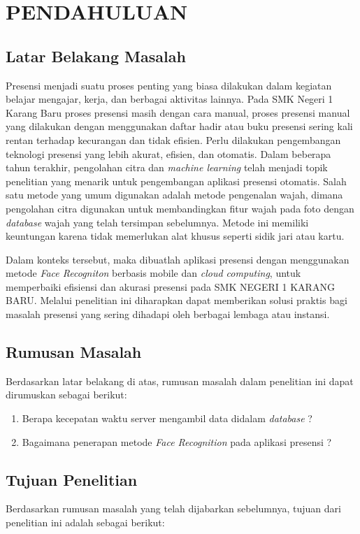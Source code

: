 \chapter{PENDAHULUAN}
\section{Latar Belakang Masalah}
Presensi menjadi suatu proses penting yang biasa dilakukan dalam kegiatan belajar mengajar, kerja, dan berbagai aktivitas lainnya. Pada SMK Negeri 1 Karang Baru proses presensi masih dengan cara manual, proses presensi manual yang dilakukan dengan menggunakan daftar hadir atau buku presensi sering kali rentan terhadap kecurangan dan tidak efisien. Perlu dilakukan pengembangan teknologi presensi yang lebih akurat, efisien, dan otomatis. Dalam beberapa tahun terakhir, pengolahan citra dan \emph{machine learning} telah menjadi topik penelitian yang menarik untuk pengembangan aplikasi presensi otomatis. Salah satu metode yang umum digunakan adalah metode pengenalan wajah, dimana pengolahan citra digunakan untuk membandingkan fitur wajah pada foto dengan \emph{database} wajah yang telah tersimpan sebelumnya. Metode ini memiliki keuntungan karena tidak memerlukan alat khusus seperti sidik jari atau kartu.\cite{nix}

Dalam konteks tersebut, maka dibuatlah aplikasi presensi dengan menggunakan metode \emph{Face Recogniton} berbasis mobile dan \emph{cloud computing}, untuk memperbaiki efisiensi dan akurasi presensi pada SMK NEGERI 1 KARANG BARU. Melalui penelitian ini diharapkan dapat memberikan solusi praktis bagi masalah presensi yang sering dihadapi oleh berbagai lembaga atau instansi.
\

\section{Rumusan Masalah}
Berdasarkan latar belakang di atas, rumusan masalah dalam penelitian ini dapat dirumuskan sebagai berikut:

\begin{enumerate}
\item Berapa kecepatan waktu server mengambil data didalam \emph{database} ?\
\item Bagaimana penerapan metode \emph{Face Recognition} pada aplikasi presensi ?
\end{enumerate}	

\section{Tujuan Penelitian}
Berdasarkan rumusan masalah yang telah dijabarkan sebelumnya, tujuan dari penelitian ini adalah sebagai berikut:

